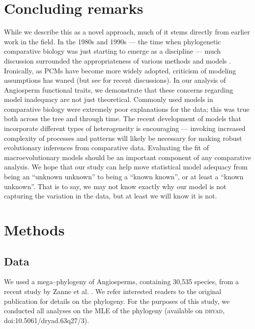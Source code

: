 \documentclass[a4paper,12pt]{article}
\begin{document}
\section{Concluding remarks}
While we describe this as a novel approach, much of it stems directly from earlier work in the field. In the 1980s and 1990s --- the time when phylogenetic comparative biology was just starting to emerge as a discipline --- much discussion surrounded the appropriateness of various methods and models \citep{Felsenstein1985, Felsenstein1988, HarveyPagel1991, Garland1992, Pagel1993, Diaz1996, Price1997, Garland1999, GarlandIves2000}. Ironically, as PCMs have become more widely adopted, criticism of modeling assumptions has waned (but see \citep{Felsenstein2012, Hansen2012} for recent discussions). In our analysis of Angiosperm functional traits, we demonstrate that these concerns regarding model inadequacy are not just theoretical. Commonly used models in comparative biology were extremely poor explanations for the data; this was true both across the tree and through time. The recent development of models that incorporate different types of heterogeneity is encouraging --- invoking increased complexity of processes and patterns will likely be necessary for making robust evolutionary inferences from comparative data. Evaluating the fit of macroevolutionary models should be an important component of any comparative analysis. We hope that our study can help move statistical model adequacy from being an ``unknown unknown''  to being a ``known known'', or at least a ``known unknown''. That is to say, we may not know exactly why our model is not capturing the variation in the data, but at least we will know it is not.

\section{Methods}

\subsection{Data}
We used a mega--phylogeny of Angiosperms, containing 30,535 species, from a recent study by Zanne et al. \citep{Zanne2013}. We refer interested readers to the original publication for details on the phylogeny. For the purposes of this study, we conducted all analyses on the MLE of the phylogeny (available on \textsc{dryad}, doi:10.5061/dryad.63q27/3).
\end{document}
